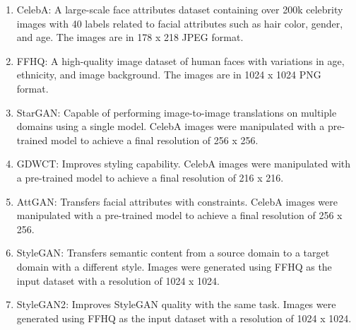         \begin{enumerate}
            \item CelebA\cite{7410782}: A large-scale face attributes dataset containing over 200k celebrity images with 40 labels related to facial attributes such as hair color, gender, and age. The images are in 178 x 218 JPEG format.
            
            \item FFHQ\cite{NVlabs_ffhq_dataset}: A high-quality image dataset of human faces with variations in age, ethnicity, and image background. The images are in 1024 x 1024 PNG format.
            
            \item StarGAN\cite{choi2018stargan}: Capable of performing image-to-image translations on multiple domains using a single model. CelebA images were manipulated with a pre-trained model to achieve a final resolution of 256 x 256.
            
            \item GDWCT\cite{cho2019imagetoimage}: Improves styling capability. CelebA images were manipulated with a pre-trained model to achieve a final resolution of 216 x 216.
    
            \item AttGAN\cite{8718508}: Transfers facial attributes with constraints. CelebA images were manipulated with a pre-trained model to achieve a final resolution of 256 x 256.
        
            \item StyleGAN\cite{Karras_2020_CVPR}: Transfers semantic content from a source domain to a target domain with a different style. Images were generated using FFHQ as the input dataset with a resolution of 1024 x 1024.
        
            \item StyleGAN2\cite{inproceedings}: Improves StyleGAN quality with the same task. Images were generated using FFHQ as the input dataset with a resolution of 1024 x 1024.
        \end{enumerate}
        
